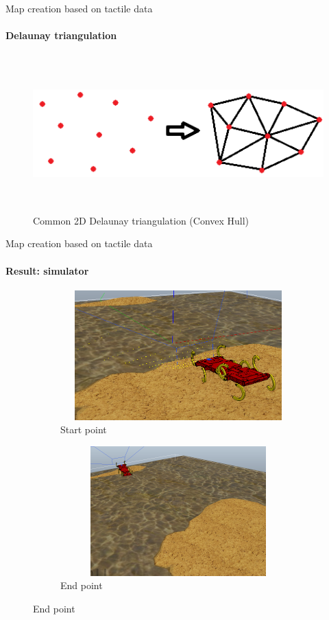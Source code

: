 \documentclass[aspectratio=169]{beamer}
\begin{document}
\begin{frame}[t]{Map creation based on tactile data}
    \framesubtitle{Delaunay triangulation}
    \vspace{-0.2cm}
    \begin{figure}[H]
        \centering\includegraphics[height=6cm,width=1\textwidth,keepaspectratio]{delone_idea.png}
        \caption*{Common 2D Delaunay triangulation (Convex Hull)}
        \label{fig:delone_idea.png}
    \end{figure}
\end{frame}

\begin{frame}[t]{Map creation based on tactile data}
    \framesubtitle{Result: simulator}
    \vspace{-15pt}
    \begin{figure}[H]
        \begin{subfigure}{0.49\textwidth}
            \centering\includegraphics[height=5cm,width=1\textwidth,keepaspectratio]{terrain_w_water1.png}
            \caption*{Start point}
        \end{subfigure}
        \begin{subfigure}{0.49\textwidth}
            \centering\includegraphics[height=5cm,width=1\textwidth,keepaspectratio]{terrain_w_water_end.png}
            \caption*{End point}
        \end{subfigure}
    \end{figure}
\end{frame}
\end{document}
